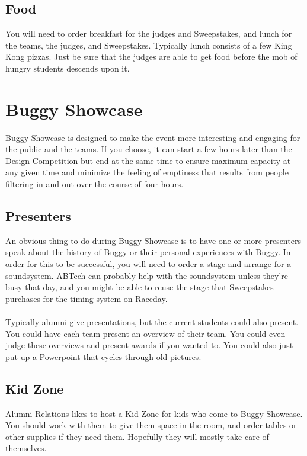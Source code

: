 \subsection{Food}
You will need to order breakfast for the judges and Sweepstakes, and lunch
for the teams, the judges, and Sweepstakes. Typically lunch consists of a few
King Kong pizzas. Just be sure that the judges are able to get food before
the mob of hungry students descends upon it.


\section{Buggy Showcase}
\label{sec:Showcase}
Buggy Showcase is designed to make the event more interesting and engaging
for the public and the teams. If you choose, it can start a few hours later
than the Design Competition but end at the same time to ensure maximum
capacity at any given time and minimize the feeling of emptiness that
results from people filtering in and out over the course of four hours.

\subsection{Presenters}
An obvious thing to do during Buggy Showcase is to have one or more presenters
speak about the history of Buggy or their personal experiences with Buggy. In
order for this to be successful, you will need to order a stage and arrange
for a soundsystem. ABTech can probably help with the soundsystem unless they're
busy that day, and you might be able to reuse the stage that Sweepstakes
purchases for the timing system on Raceday.
\\\\
Typically alumni give presentations, but the current students could also
present. You could have each team present an overview of their team.
You could even judge these overviews and present awards if you wanted to.
You could also just put up a Powerpoint that cycles through old pictures.

\subsection{Kid Zone}
Alumni Relations likes to host a Kid Zone for kids who come to Buggy Showcase.
You should work with them to give them space in the room, and order tables
or other supplies if they need them. Hopefully they will mostly take
care of themselves.

